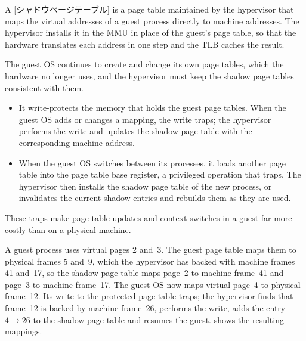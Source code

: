 \documentclass[../main.tex]{subfiles}
\begin{document}
\begin{definition}
  A [シャドウページテーブル] is a page table
  maintained by the hypervisor that maps the virtual addresses of a guest
  process directly to machine addresses.  The hypervisor installs it in the
  MMU in place of the guest's page table, so that the hardware translates
  each address in one step and the TLB caches the result.
\end{definition}

The guest OS continues to create and change its own page tables, which the
hardware no longer uses, and the hypervisor must keep the shadow page
tables consistent with them.
\begin{itemize}
  \item It write-protects the memory that holds the guest page tables.
    When the guest OS adds or changes a mapping, the write traps; the
    hypervisor performs the write and updates the shadow page table with
    the corresponding machine address.
  \item When the guest OS switches between its processes, it loads another
    page table into the page table base register, a privileged operation
    that traps.  The
    hypervisor then installs the shadow page table of the
    new process, or invalidates the current shadow entries and rebuilds
    them as they are used.
\end{itemize}
These traps make page table updates and context switches in a guest far
more costly than on a physical machine.

\begin{example}
  A guest process uses virtual pages 2 and~3.  The guest page table maps
  them to physical frames 5 and~9, which the hypervisor has backed with
  machine frames 41 and~17, so the shadow page table maps page~2 to
  machine frame~41 and page~3 to machine frame~17.  The guest OS now maps
  virtual page~4 to physical frame~12.  Its write to the protected page
  table traps; the hypervisor finds that frame~12 is backed by machine
  frame~26, performs the write, adds the entry $4 \to 26$ to the shadow
  page table and resumes the guest.   shows the
  resulting mappings.
\end{example}
\end{document}
